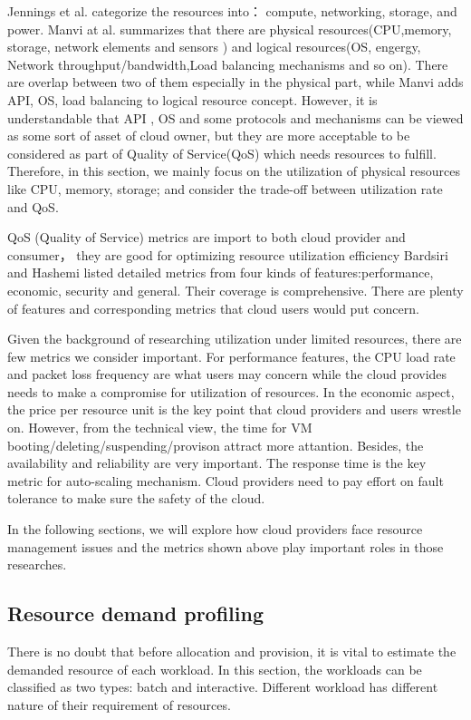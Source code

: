 \documentclass[sigchi]{acmart}
\begin{document}
Jennings et al. categorize the resources into： compute, networking, storage, and power. 
Manvi at al. summarizes that there are physical resources(CPU,memory, storage, network elements and sensors ) and logical resources(OS, engergy, Network throughput/bandwidth,Load balancing mechanisms and so on).
There are overlap between two of them especially in the physical part, while Manvi adds API, OS, load balancing to logical resource concept.
However, it is understandable that API , OS and some protocols and mechanisms  can be viewed as some sort of asset of cloud owner, but they are more acceptable to be considered as part of Quality of Service(QoS) which needs resources to fulfill.
Therefore, in this section, we mainly focus on the utilization of physical resources like CPU, memory, storage; and consider the trade-off between utilization rate and QoS.

QoS (Quality of Service) metrics are import to both cloud provider and consumer， they are good for optimizing resource utilization efficiency
Bardsiri and Hashemi listed detailed metrics from four kinds of features:performance, economic, security and general. \cite{Bardsiri2014}
Their coverage is comprehensive. There are plenty of features and corresponding metrics that cloud users would put concern.

Given the background of researching utilization under limited resources, there are few metrics we consider important. 
For performance features, the CPU load rate and packet loss frequency are what users may concern while the cloud provides needs to make a compromise for utilization of resources.
In the economic aspect, the price per resource unit is the key point that cloud  providers and users wrestle on. However, from the technical view, the time for VM booting/deleting/suspending/provison attract more attantion.
Besides, the availability and reliability are very important. The response time is the key metric for auto-scaling mechanism.
Cloud providers need to pay effort on fault tolerance to make sure the safety of the cloud.

In the following sections, we will explore how cloud providers face resource management issues and the metrics shown above play important roles in  those researches.

\subsection{Resource demand profiling }
There is no doubt that before allocation and provision, it is vital to estimate the demanded resource of each workload. In this section, the workloads can be classified as two types: batch and interactive.
Different workload has different nature of their requirement of resources. 
\end{document}
